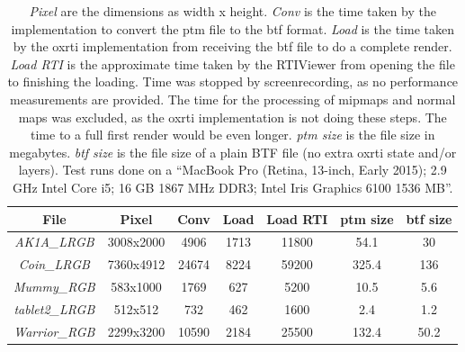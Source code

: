\begin{table}[H]
\begin{tabular}{|c |  c c c c c c|}
 \hline
 File & Pixel & Conv & Load & Load RTI &
 ptm size & btf size\\
  \hline
  \emph{AK1A\_LRGB} & 3008x2000 & 4906 & 1713 & 11800 & 54.1 & 30  \\
  \emph{Coin\_LRGB} & 7360x4912 & 24674 & 8224 & 59200 & 325.4 & 136  \\
  \emph{Mummy\_RGB} & 583x1000 & 1769 & 627 & 5200 & 10.5 & 5.6  \\
  \emph{tablet2\_LRGB} & 512x512 & 732 & 462 & 1600 & 2.4 & 1.2  \\
  \emph{Warrior\_RGB} & 2299x3200 & 10590 & 2184 & 25500 & 132.4 & 50.2  \\
 \hline
\end{tabular}
\caption[Performance Comparison]{\emph{Pixel} are the dimensions as width x height. \emph{Conv} is the time taken
by the implementation to convert the ptm file to the btf format. \emph{Load} is
the time taken by the oxrti implementation from receiving the btf file to do a complete render. \emph{Load
  RTI} is the approximate time taken by the RTIViewer from opening the file to
finishing the loading. Time was stopped by screenrecording, as no performance
measurements are provided. The time for the processing of mipmaps and normal
maps was excluded, as the oxrti implementation is not doing these steps. The
time to a full first render would be even longer. \emph{ptm size} is the file size in
megabytes. \emph{btf size} is the file size of a plain BTF file (no extra oxrti
state and/or layers). Test runs done on a ``MacBook Pro (Retina, 13-inch, Early
2015); 2.9 GHz Intel Core i5; 16 GB 1867 MHz DDR3; Intel Iris Graphics 6100 1536 MB''. }
\label{table_fileformat_results}
\end{table}

